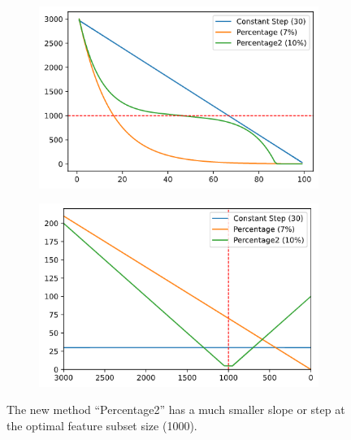 \begin{figure}[h]
    \centering
    \begin{subfigure}[b]{0.4\linewidth}
        \includegraphics[width=\linewidth]{img/ch5/stopcond/lines.png}
    \end{subfigure}
    \hspace{0.05\linewidth}
    \begin{subfigure}[b]{0.4\linewidth}
        \includegraphics[width=\linewidth]{img/ch5/stopcond/lines2.png}
    \end{subfigure}
    \caption[Stop condition: Improving on dynamic step]{The new method “Percentage2” has a much smaller slope or step at the optimal feature subset size (1000).}
    \label{fig:ch5.stopcond.lines}
\end{figure}

